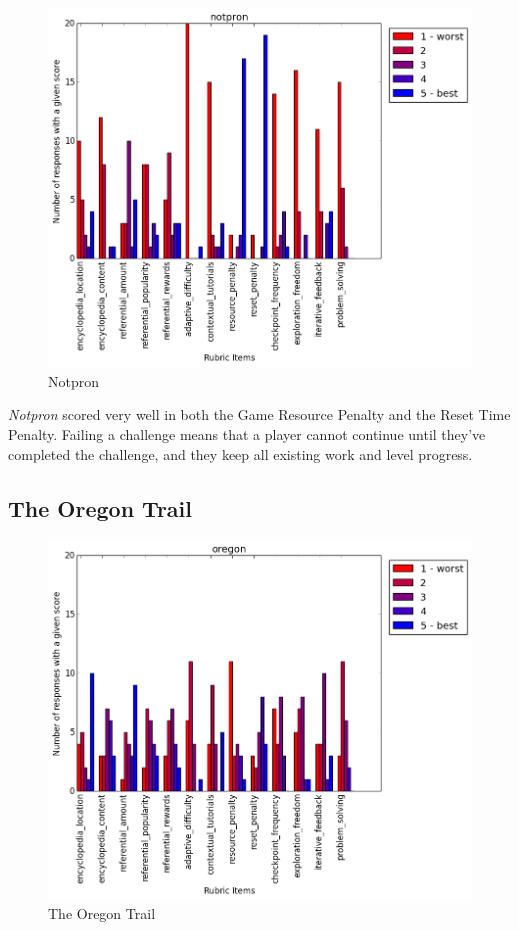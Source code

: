 				\begin{figure}[] 
				\centering 
				\includegraphics[width=\textwidth, height=.4\textheight, keepaspectratio=true]{notpron_scores.png} 
				\caption{Notpron}
				\end{figure}

				\textit{Notpron} scored very well in both the Game Resource Penalty and the Reset Time Penalty. Failing a challenge means that a player cannot continue until they've completed the challenge, and they keep all existing work and level progress.

			\subsection{The Oregon Trail}

				\begin{figure}[] 
				\centering 
				\includegraphics[width=\textwidth, height=.4\textheight, keepaspectratio=true]{oregon_scores.png} 
				\caption{The Oregon Trail}
				\end{figure}

